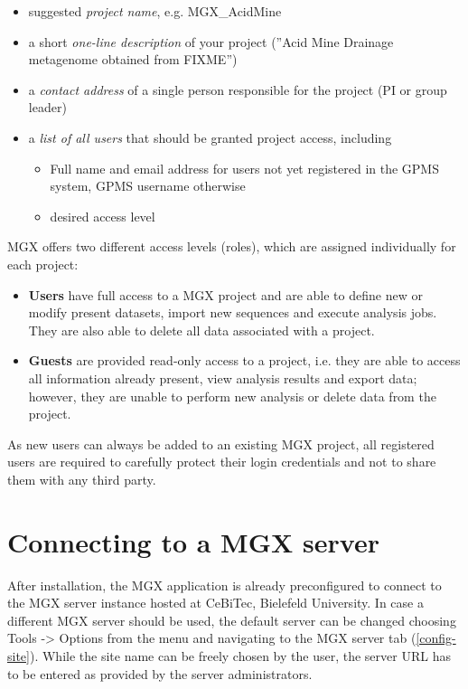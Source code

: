 \begin{itemize}
  \item suggested \textit{project name}, e.g. MGX\_AcidMine
  \item a short \textit{one-line description} of your project (''Acid Mine Drainage metagenome obtained from FIXME'')
  \item a \textit{contact address} of a single person responsible for the project (PI or group leader)
  \item a \textit{list of all users} that should be granted project access, including
    \begin{itemize}
      \item Full name and email address for users not yet registered in the GPMS system, GPMS username otherwise
      \item desired access level
    \end{itemize}
\end{itemize}

MGX offers two different access levels (roles), which are assigned individually for each
project: \\

\begin{itemize}
  \item \textbf{Users} have full access to a MGX project and are able to define new or modify
present datasets, import new sequences and execute analysis jobs. They are also able to
delete all data associated with a project.\\
  \item \textbf{Guests} are provided read-only access to a project, i.e. they are able to access
all information already present, view analysis results and export data; however, they are
unable to perform new analysis or delete data from the project.
\end{itemize}

As new users can always be added to an existing MGX project, all registered users are required
to carefully protect their login credentials and not to share them with any third party.

\section{Connecting to a MGX server}

After installation, the MGX application is already preconfigured to connect to the 
MGX server instance hosted at CeBiTec, Bielefeld University. In case a different MGX server
should be used, the default server can be changed choosing Tools -> Options from the menu
and navigating to the MGX server tab (\ref{config-site}). While the site name can be freely
chosen by the user, the server URL has to be entered as provided by the server administrators.

